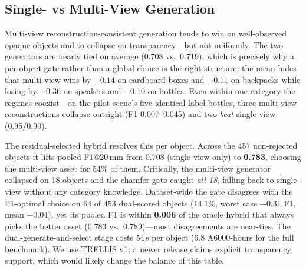 \subsection{Single- vs Multi-View Generation}
\label{sec:exp-gen}
\ifextended
\begin{table}[t]
\caption{Residual-gated hybrid over all 50 scenes: mean F1@20\,mm of each
generator, the fraction of objects for which the chamfer gate selected
multi-view, and the number of multi-view collapses (F1$<$0.1). Categories
with $\geq4$ dual-scored objects.}
\label{tab:hybridcat}
\centering\scriptsize

\end{table}
\fi


Multi-view reconstruction-consistent generation tends to win on
well-observed opaque objects and to collapse on transparency---but not
uniformly. The two generators are nearly tied on average
(0.708 vs.\ 0.719), which is precisely why a per-object gate rather than a
global choice is the right structure: the mean hides that multi-view wins
by $+0.14$ on cardboard boxes and $+0.11$ on backpacks while losing by
$-0.36$ on speakers and $-0.10$ on bottles. Even within one category the
regimes coexist---on the pilot scene's five identical-label bottles, three
multi-view reconstructions collapse outright (F1 0.007--0.045) and two
\emph{beat} single-view (0.95/0.90).

The residual-selected hybrid resolves this per object. Across the 457
non-rejected objects it lifts pooled F1@20\,mm from 0.708 (single-view
only) to \textbf{0.783}, choosing the multi-view asset for 54\% of them.
Critically, the multi-view generator collapsed on 18 objects and the
chamfer gate caught \emph{all 18}, falling back to single-view without any
category knowledge. Dataset-wide the gate disagrees with the F1-optimal
choice on 64 of 453 dual-scored objects (14.1\%, worst case $-0.31$ F1,
mean $-0.04$), yet its pooled F1 is within \textbf{0.006} of the oracle
hybrid that always picks the better asset (0.783 vs.\ 0.789)---most
disagreements are near-ties. The dual-generate-and-select stage costs
54\,s per object (6.8 A6000-hours for the full benchmark). We use TRELLIS
v1; a newer release claims explicit transparency support, which would
likely change the balance of this table.

